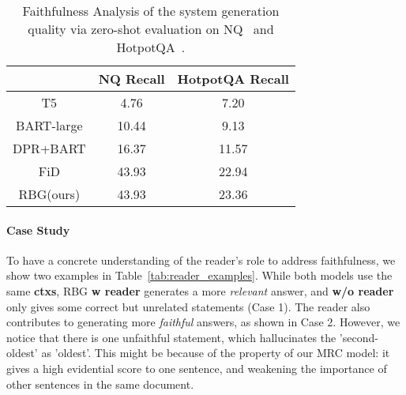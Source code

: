 \documentclass[11pt]{article}
\begin{document}
\begin{table}[!t]
\centering
\resizebox{0.40\textwidth}{!}
{
\begin{tabular}{c|cc}
\hline
          & NQ Recall   & HotpotQA Recall\\ \hline
T5         & 4.76  & 7.20     \\
BART-large & 10.44 & 9.13   \\
DPR+BART   & 16.37 & 11.57     \\
FiD      & 43.93 & 22.94    \\ \hline
RBG(ours)  & 43.93 & 23.36    \\ \hline
\end{tabular}
}
\vspace{-5pt}
\caption{Faithfulness Analysis of the system generation quality via zero-shot evaluation on NQ~\cite{kwiatkowski2019natural} and HotpotQA~\cite{yang2018HotpotQA}.}
\vspace{-10pt}
\label{nq_HotpotQA}
\vspace{-5pt}
\end{table}


\vspace{-6pt}
\paragraph{Case Study} To have a concrete understanding of the reader's role to address faithfulness, we show two examples in Table~\ref{tab:reader_examples}. While both models use the same \textbf{ctxs}, RBG \textbf{w reader} generates a more \textit{relevant} answer, and \textbf{w/o reader} only gives some correct but unrelated statements (Case 1). The reader also contributes to generating more \textit{faithful} answers, as shown in Case 2. However, we notice that there is one unfaithful statement, which hallucinates the 'second-oldest' as 'oldest'. This might be because of the property of our MRC model: it gives a high evidential score to one sentence, and weakening the importance of other sentences in the same document.
\end{document}
